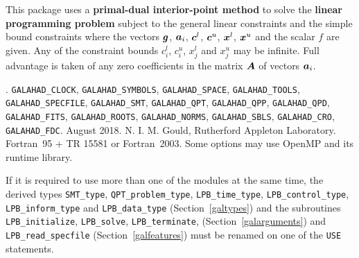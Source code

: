 \documentclass{galahad}
\newcommand{\packagename}{LPB}
\newcommand{\fullpackagename}{\libraryname\_\packagename}
\begin{document}
\galheader


\galsummary
This package uses a {\bf primal-dual interior-point method}
to solve the {\bf linear programming problem}
subject to the general linear constraints
and the simple bound constraints
where the vectors ${\bm{g}}$, ${\bm{a}}_{i}$, ${\bm{c}}^{l}$, ${\bm{c}}^{u}$, ${\bm{x}}^{l}$,
${\bm{x}}^{u}$ and the scalar $f$ are given.
Any of the constraint bounds $c_{i}^{l}$, $c_{i}^{u}$,
$x_{j}^{l}$ and $x_{j}^{u}$ may be infinite.
Full advantage is taken of any zero coefficients in
the matrix ${\bm{A}}$ of vectors ${\bm{a}}_{i}$.


\galattributes
\galversions{\tt  \fullpackagename\_single, \fullpackagename\_double}.
\galuses
{\tt GALAHAD\_CLOCK},
{\tt GALAHAD\_SY\-M\-BOLS},
{\tt GALAHAD\-\_SPACE},
{\tt GALAHAD\_TOOLS},
{\tt GALAHAD\_SPECFILE},
{\tt GALAHAD\_SMT},
{\tt GALAHAD\_QPT},
{\tt GALAHAD\_QPP},
{\tt GALAHAD\_\-QPD},
{\tt GALAHAD\_\-FITS},
{\tt GALAHAD\_\-ROOTS},
{\tt GALAHAD\_\-NORMS},
{\tt GALAHAD\_\-SBLS},
{\tt GALAHAD\_\-CRO},
{\tt GALAHAD\_FDC}.
\galdate August 2018.
\galorigin N. I. M. Gould, Rutherford Appleton Laboratory.
\gallanguage Fortran~95 + TR 15581 or Fortran~2003.
\galparallelism Some options may use OpenMP and its runtime library.


\galhowto



\noindent
If it is required to use more than one of the modules at the same time, 
the derived types
{\tt SMT\_type},
{\tt QPT\_problem\_type},
{\tt \packagename\_time\_type},
{\tt \packagename\_control\_type},
{\tt \packagename\_inform\_type}
and
{\tt \packagename\_data\_type}
(Section~\ref{galtypes})
and the subroutines
{\tt \packagename\_initialize},
{\tt \packagename\_\-solve},
{\tt \packagename\_terminate},
(Section~\ref{galarguments})
and
{\tt \packagename\_read\_specfile}
(Section~\ref{galfeatures})
must be renamed on one of the {\tt USE} statements.

\end{document}
